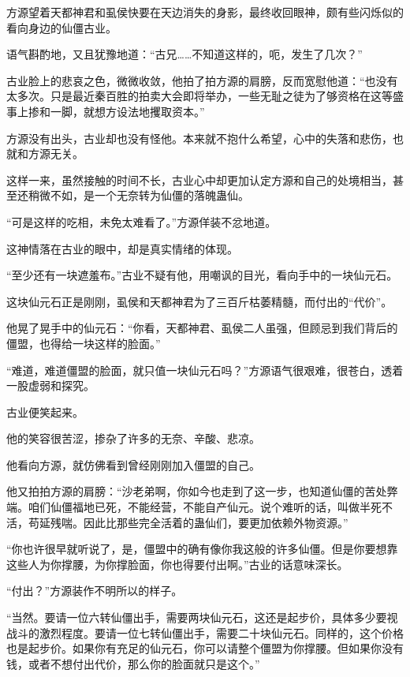 
\begin{this_body}



方源望着天都神君和虱侯快要在天边消失的身影，最终收回眼神，颇有些闪烁似的看向身边的仙僵古业。

语气斟酌地，又且犹豫地道：“古兄……不知道这样的，呃，发生了几次？”

古业脸上的悲哀之色，微微收敛，他拍了拍方源的肩膀，反而宽慰他道：“也没有太多次。只是最近秦百胜的拍卖大会即将举办，一些无耻之徒为了够资格在这等盛事上掺和一脚，就想方设法地攫取资本。”

方源没有出头，古业却也没有怪他。本来就不抱什么希望，心中的失落和悲伤，也就和方源无关。

这样一来，虽然接触的时间不长，古业心中却更加认定方源和自己的处境相当，甚至还稍微不如，是一个无奈转为仙僵的落魄蛊仙。

“可是这样的吃相，未免太难看了。”方源佯装不忿地道。

这神情落在古业的眼中，却是真实情绪的体现。

“至少还有一块遮羞布。”古业不疑有他，用嘲讽的目光，看向手中的一块仙元石。

这块仙元石正是刚刚，虱侯和天都神君为了三百斤枯萎精髓，而付出的“代价”。

他晃了晃手中的仙元石：“你看，天都神君、虱侯二人虽强，但顾忌到我们背后的僵盟，也得给一块这样的脸面。”

“难道，难道僵盟的脸面，就只值一块仙元石吗？”方源语气很艰难，很苍白，透着一股虚弱和探究。

古业便笑起来。

他的笑容很苦涩，掺杂了许多的无奈、辛酸、悲凉。

他看向方源，就仿佛看到曾经刚刚加入僵盟的自己。

他又拍拍方源的肩膀：“沙老弟啊，你如今也走到了这一步，也知道仙僵的苦处弊端。咱们仙僵福地已死，不能经营，不能自产仙元。说个难听的话，叫做半死不活，苟延残喘。因此比那些完全活着的蛊仙们，要更加依赖外物资源。”

“你也许很早就听说了，是，僵盟中的确有像你我这般的许多仙僵。但是你要想靠这些人为你撑腰，为你撑脸面，你也得要付出啊。”古业的话意味深长。

“付出？”方源装作不明所以的样子。

“当然。要请一位六转仙僵出手，需要两块仙元石，这还是起步价，具体多少要视战斗的激烈程度。要请一位七转仙僵出手，需要二十块仙元石。同样的，这个价格也是起步价。如果你有充足的仙元石，你可以请整个僵盟为你撑腰。但如果你没有钱，或者不想付出代价，那么你的脸面就只是这个。”


\end{this_body}
